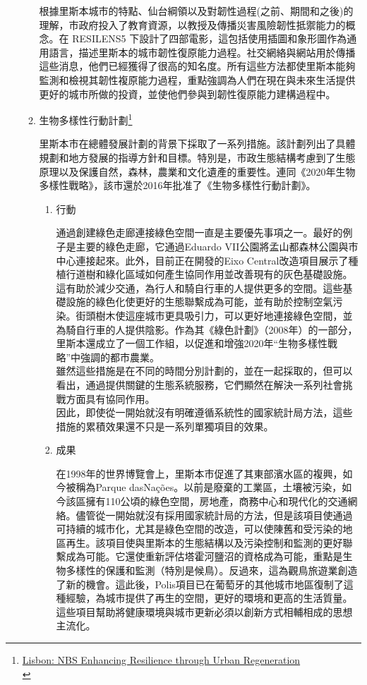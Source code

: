 \documentclass[a4paper,12pt]{article}
\begin{document}
\begin{enumerate}
\begin{enumerate}
根據里斯本城市的特點、仙台綱領以及對韌性過程(之前、期間和之後)的理解，市政府投入了教育資源，以教授及傳播災害風險韌性抵禦能力的概念。在 RESILENS5 下設計了四部電影，這包括使用插圖和象形圖作為通用語言，描述里斯本的城市韌性復原能力過程。社交網絡與網站用於傳播這些消息，他們已經獲得了很高的知名度。所有這些方法都使里斯本能夠監測和檢視其韌性複原能力過程，重點強調為人們在現在與未來生活提供更好的城市所做的投資，並使他們參與到韌性復原能力建構過程中。\\
\item 生物多樣性行動計劃\footnote{\href{https://oppla.eu/casestudy/19462}{Lisbon: NBS Enhancing Resilience through Urban Regeneration}\\}
\label{sec:org77540b3}

里斯本市在總體發展計劃的背景下採取了一系列措施。該計劃列出了具體規劃和地方發展的指導方針和目標。特別是，市政生態結構考慮到了生態原理以及保護自然，森林，農業和文化遺產的重要性。連同《2020年生物多樣性戰略》，該市還於2016年批准了《生物多樣性行動計劃》。\\
\begin{enumerate}
\item 行動
\label{sec:orgb247b7e}

通過創建綠色走廊連接綠色空間一直是主要優先事項之一。最好的例子是主要的綠色走廊，它通過Eduardo VII公園將孟山都森林公園與市中心連接起來。此外，目前正在開發的Eixo Central改造項目展示了種植行道樹和綠化區域如何產生協同作用並改善現有的灰色基礎設施。這有助於減少交通，為行人和騎自行車的人提供更多的空間。這些基礎設施的綠色化使更好的生態聯繫成為可能，並有助於控制空氣污染。街頭樹木使這座城市更具吸引力，可以更好地連接綠色空間，並為騎自行車的人提供陰影。作為其《綠色計劃》（2008年）的一部分，里斯本還成立了一個工作組，以促進和增強2020年“生物多樣性戰略”中強調的都市農業。\\

雖然這些措施是在不同的時間分別計劃的，並在一起採取的，但可以看出，通過提供關鍵的生態系統服務，它們顯然在解決一系列社會挑戰方面具有協同作用。\\

因此，即使從一開始就沒有明確遵循系統性的國家統計局方法，這些措施的累積效果還不只是一系列單獨項目的效果。\\
\item 成果
\label{sec:org3a1da9e}

在1998年的世界博覽會上，里斯本市促進了其東部濱水區的複興，如今被稱為Parque dasNações。以前是廢棄的工業區，土壤被污染，如今該區擁有110公頃的綠色空間，房地產，商務中心和現代化的交通網絡。儘管從一開始就沒有採用國家統計局的方法，但是該項目使通過可持續的城市化，尤其是綠色空間的改造，可以使陳舊和受污染的地區再生。該項目使與里斯本的生態結構以及污染控制和監測的更好聯繫成為可能。它還使重新評估塔霍河鹽沼的資格成為可能，重點是生物多樣性的保護和監測（特別是候鳥）。反過來，這為觀鳥旅遊業創造了新的機會。這此後，Polis項目已在葡萄牙的其他城市地區復制了這種經驗，為城市提供了再生的空間，更好的環境和更高的生活質量。這些項目幫助將健康環境與城市更新必須以創新方式相輔相成的思想主流化。\\


\end{enumerate}
\end{enumerate}
\end{enumerate}
\end{document}
